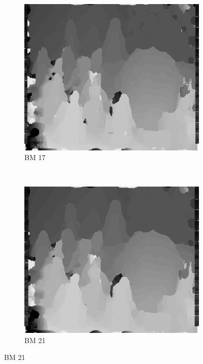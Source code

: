 \begin{figure}
\begin{subfigure}[b]{0.23\textwidth}
    \centering
    \includegraphics[width=\textwidth]{images/stereo-pairs/cones_bm_17.png}
    \caption{BM 17}
  \end{subfigure}
  ~
  \begin{subfigure}[b]{0.23\textwidth}
    \centering
    \includegraphics[width=\textwidth]{images/stereo-pairs/cones_bm_21.png}
    \caption{BM 21}
  \end{subfigure}


\end{figure}
